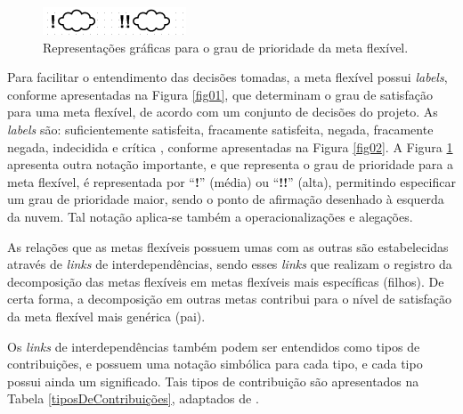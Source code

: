 \begin{figure}[h!]
	\centering
	\includegraphics[keepaspectratio=true,scale=0.9]{figuras/prioridadeMeta.PNG}
	\caption{Representações gráficas para o grau de prioridade da meta flexível.}
	\label{prioridadedameta}
\end{figure}

Para facilitar o entendimento das decisões tomadas, a meta flexível possui \textit{labels}, conforme apresentadas na Figura \ref{fig01}, que determinam o grau de satisfação para uma meta flexível, de acordo com um conjunto de decisões do projeto. As \textit{labels} são: suficientemente satisfeita, fracamente satisfeita,  negada, fracamente negada, indecidida e crítica \cite{chung2012non}, conforme apresentadas na Figura \ref{fig02}. A Figura \ref{prioridadedameta} apresenta outra notação importante, e que representa o grau de prioridade para a meta flexível, é representada por “\textbf{!}” (média) ou “\textbf{!!}” (alta), permitindo especificar um grau de prioridade maior, sendo o ponto de afirmação desenhado à esquerda da nuvem. Tal notação aplica-se também a operacionalizações e alegações.



As relações que as metas flexíveis possuem umas com as outras são estabelecidas através de \textit{links} de interdependências, sendo esses \textit{links} que realizam o registro da decomposição das metas flexíveis em metas flexíveis mais específicas (filhos). De certa forma, a decomposição em outras metas contribui para o nível de satisfação da meta flexível mais genérica (pai).

Os \textit{links} de interdependências também podem ser entendidos como tipos de contribuições, e possuem uma notação simbólica para cada tipo, e cada tipo possui ainda um significado.  Tais tipos de contribuição são apresentados na Tabela \ref{tiposDeContribuições}, adaptados de  \cite{chung2012non}.



